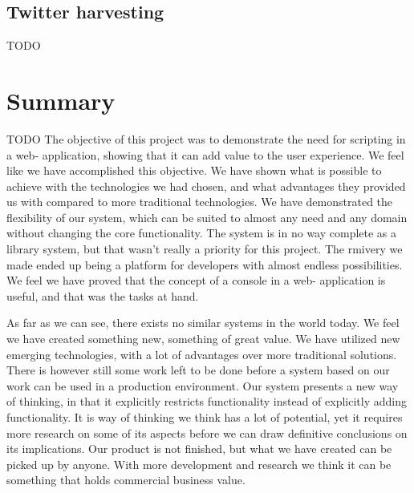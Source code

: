 \subsection{Twitter harvesting}
TODO


\section{Summary}
TODO
The objective of this project was to demonstrate the need for scripting in a web- application, showing that it can add value to the user experience. We feel like we have accomplished this objective. We have shown what is possible to achieve with the technologies we had chosen, and what advantages they provided us with compared to more traditional technologies. We have demonstrated the flexibility of our system, which can be suited to almost any need and any domain without changing the core functionality. The system is in no way complete as a library system, but that wasn’t really a priority for this project. The rmivery we made ended up being a platform for developers with almost endless possibilities. We feel we have proved that the concept of a console in a web- application is useful, and that was the tasks at hand.

As far as we can see, there exists no similar systems in the world today. We feel we have created something new, something of great value. We have utilized new emerging technologies, with a lot of advantages over more traditional solutions. There is however still some work left to be done before a system based on our work can be used in a production environment. Our system presents a new way of thinking, in that it explicitly restricts functionality instead of explicitly adding functionality. It is way of thinking we think has a lot of potential, yet it requires more research on some of its aspects before we can draw definitive conclusions on its implications. Our product is not finished, but what we have created can be picked up by anyone. With more development and research we think it can be something that holds commercial business value.


